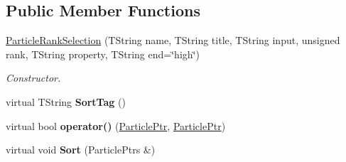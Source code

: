 \subsection*{Public Member Functions}
\begin{DoxyCompactItemize}
\item 
\hyperlink{class_h_a_l_1_1_algorithms_1_1_particle_rank_selection_acbba84c85f7090200eda0d2a0bd9c677}{Particle\+Rank\+Selection} (T\+String name, T\+String title, T\+String input, unsigned rank, T\+String property, T\+String end=\char`\"{}high\char`\"{})
\begin{DoxyCompactList}\small\item\em Constructor. \end{DoxyCompactList}\item 
\hypertarget{class_h_a_l_1_1_algorithms_1_1_particle_rank_selection_acce9ba5e039ebd2040b5f7172586e5b1}{virtual T\+String {\bfseries Sort\+Tag} ()}\label{class_h_a_l_1_1_algorithms_1_1_particle_rank_selection_acce9ba5e039ebd2040b5f7172586e5b1}

\item 
\hypertarget{class_h_a_l_1_1_algorithms_1_1_particle_rank_selection_ac1e2275f72f43fd1e80fdbdefbfe9aaf}{virtual bool {\bfseries operator()} (\hyperlink{class_h_a_l_1_1_generic_particle}{Particle\+Ptr}, \hyperlink{class_h_a_l_1_1_generic_particle}{Particle\+Ptr})}\label{class_h_a_l_1_1_algorithms_1_1_particle_rank_selection_ac1e2275f72f43fd1e80fdbdefbfe9aaf}

\item 
\hypertarget{class_h_a_l_1_1_algorithms_1_1_particle_rank_selection_a0519f017f9142ce0d484b3e99f70aa19}{virtual void {\bfseries Sort} (Particle\+Ptrs \&)}\label{class_h_a_l_1_1_algorithms_1_1_particle_rank_selection_a0519f017f9142ce0d484b3e99f70aa19}

\end{DoxyCompactItemize}

